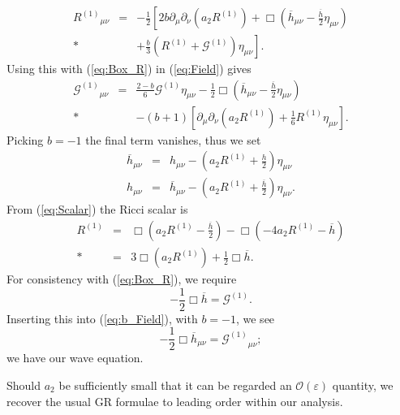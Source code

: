 \documentclass[aps,prd,amsfonts,amssymb,amsmath,nofootinbib,reprint,showpacs]{revtex4-1}
\newcommand{\eqnref}[1]{(\ref{eq:#1})}
\newcommand{\recip}[1]{\ensuremath{\frac{1}{#1}}}
\newcommand{\order}[1]{\ensuremath{\mathcal{O}({#1})}}
\begin{document}
\begin{eqnarray}
{R^{(1)}}_{\mu\nu} & = & -\frac{1}{2}\left[2b \partial_\mu\partial_\nu(a_2  R^{(1)}) + \Box\left(\overline{h}_{\mu\nu} -\frac{\overline{h}}{2}\eta_{\mu\nu}\right) \right. \nonumber \\*
 & &  +\left . \frac{b}{3}(R^{(1)} + \mathcal{G}^{(1)})\eta_{\mu\nu}\right].
\end{eqnarray}
Using this with \eqnref{Box_R} in \eqnref{Field} gives
\begin{eqnarray}
{\mathcal{G}^{(1)}}_{\mu\nu} & = & \frac{2 - b}{6}\mathcal{G}^{(1)}\eta_{\mu\nu} -\frac{1}{2}\Box\left(\overline{h}_{\mu\nu} - \frac{\overline{h}}{2}\eta_{\mu\nu}\right) \nonumber \\*
 & & - (b + 1)\left[\partial_\mu\partial_\nu(a_2 R^{(1)}) + \recip{6}R^{(1)}\eta_{\mu\nu}\right].
\label{eq:b_Field}
\end{eqnarray}
Picking $b = -1$ the final term vanishes, thus we set~\cite{Corda2007, Capozziello2008}
\begin{subequations}
\begin{eqnarray}
\label{eq:hbar_metric}
\overline{h}_{\mu\nu} & = & h_{\mu\nu} - \left(a_2 R^{(1)} + \frac{h}{2}\right)\eta_{\mu\nu}\\
h_{\mu\nu} & = & \overline{h}_{\mu\nu} - \left(a_2 R^{(1)} + \frac{\overline{h}}{2}\right)\eta_{\mu\nu}.
\label{eq:h_metric}
\end{eqnarray}
\end{subequations}
From \eqnref{Scalar} the Ricci scalar is 
\begin{eqnarray}
R^{(1)} & = & \Box \left(a_2 R^{(1)} -\frac{\overline{h}}{2}\right) - \Box (-4 a_2 R^{(1)} - \overline{h}) \nonumber \\*
 & = & 3 \Box(a_2 R^{(1)}) + \frac{1}{2}\Box \overline{h}.
\label{eq:Ricci_Box_h}
\end{eqnarray}
For consistency with \eqnref{Box_R}, we require
\begin{equation}
-\recip{2}\Box \overline{h} = \mathcal{G}^{(1)}.
\label{eq:Box_h}
\end{equation}
Inserting this into \eqnref{b_Field}, with $b = -1$, we see
\begin{equation}
-\recip{2}\Box \overline{h}_{\mu\nu} = {\mathcal{G}^{(1)}}_{\mu\nu};
\label{eq:Box_hmunu}
\end{equation}
we have our wave equation.

Should $a_2$ be sufficiently small that it can be regarded an $\order{\varepsilon}$ quantity, we recover the usual GR formulae to leading order within our analysis.
\end{document}
